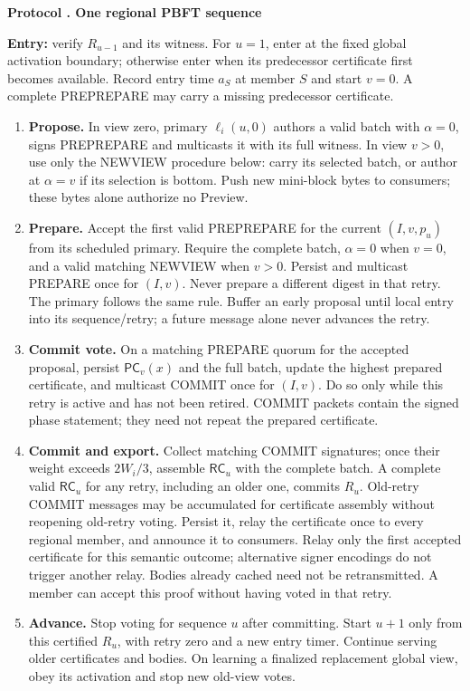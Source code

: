 \documentclass[11pt,a4paper,onecolumn]{article}
\newcommand{\RC}{\mathsf{RC}}
\newcommand{\PC}{\mathsf{PC}}
\theoremstyle{remark}\newtheorem{example}[definition]{Example}
\newcounter{protocol}
\newenvironment{protocol}[2]{\refstepcounter{protocol}\label{#1}\begin{mdframed}[nobreak=true,linewidth=.6pt,skipabove=10pt,skipbelow=10pt,innertopmargin=8pt,innerbottommargin=8pt]\small\raggedright\noindent\textbf{Protocol \theprotocol. #2}\par\smallskip}{\end{mdframed}}
\begin{document}
\begin{protocol}{alg:regional}{One regional PBFT sequence}
\textbf{Entry:} verify $R_{u-1}$ and its witness. For $u=1$, enter at the fixed
global activation boundary; otherwise enter when its predecessor certificate
first becomes available. Record entry time $a_S$ at member $S$ and start $v=0$.
A complete PREPREPARE may carry a missing predecessor certificate.
\begin{enumerate}[label=\textbf{R\arabic*.}]
\item \textbf{Propose.} In view zero, primary $\ell_i(u,0)$ authors a valid
batch with $\alpha=0$, signs PREPREPARE and multicasts it with its full witness.
In view $v>0$, use only the NEWVIEW procedure below: carry its selected batch,
or author at $\alpha=v$ if its selection is bottom. Push new mini-block bytes
to consumers; these bytes alone authorize no Preview.
\item \textbf{Prepare.} Accept the first valid PREPREPARE for the current
$(I,v,p_u)$ from its scheduled primary. Require the complete batch, $\alpha=0$
when $v=0$, and a valid matching NEWVIEW when $v>0$. Persist and multicast
PREPARE once for $(I,v)$. Never prepare a different digest in that retry.
The primary follows the same rule. Buffer an early proposal until local entry
into its sequence/retry; a future message alone never advances the retry.
\item \textbf{Commit vote.} On a matching PREPARE quorum for the accepted
proposal, persist $\PC_v(x)$ and the full batch, update the highest prepared
certificate, and multicast COMMIT once for $(I,v)$. Do so only while this
retry is active and has not been retired. COMMIT packets contain the signed
phase statement; they need not repeat the prepared certificate.
\item \textbf{Commit and export.} Collect matching COMMIT signatures; once
their weight exceeds $2W_i/3$, assemble $\RC_u$ with the complete batch.
A complete valid $\RC_u$ for any retry,
including an older one, commits $R_u$. Old-retry COMMIT messages may be
accumulated for certificate assembly without reopening old-retry voting. Persist it, relay the certificate once
to every regional member, and announce it to consumers. Relay only the first
accepted certificate for this semantic outcome; alternative signer encodings
do not trigger another relay. Bodies already cached need not be retransmitted.
A member can accept this proof without having voted in that retry.
\item \textbf{Advance.} Stop voting for sequence $u$ after committing. Start
$u+1$ only from this certified $R_u$, with retry zero and a new entry timer.
Continue serving older certificates and bodies. On learning a finalized
replacement global view, obey its activation and stop new old-view votes.
\end{enumerate}
\end{protocol}
\end{document}
